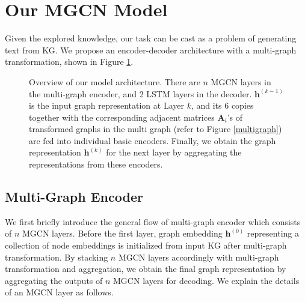 \documentclass[11pt,a4paper]{article}
\renewcommand{\vec}[1]{\mathbf{#1}} \usepackage{color, colortbl}
\renewcommand{\vec}[1]{\mathbf{#1}}
\begin{document}
\section{Our MGCN Model}
Given the explored knowledge, our task can be cast as a problem of generating text from KG.
We propose an encoder-decoder architecture with a multi-graph transformation, shown in Figure \ref{layer}.

\begin{figure*}[t!]
\caption{\label{layer} Overview of our model architecture. There are $n$ MGCN layers in the multi-graph encoder, and 2 LSTM layers in the decoder. $\vec{h}^{(k-1)}$ is the input graph representation at Layer $k$, and its 6 copies together with the corresponding adjacent matrices $\mathbf{A}_i$'s of transformed graphs in the multi graph (refer to Figure \ref{multigraph}) are fed into individual basic encoders.  Finally, we obtain the graph representation $\vec{h}^{(k)}$ for the next layer by aggregating the representations from these encoders.}
\end{figure*}

\subsection{Multi-Graph Encoder}
We first briefly introduce the general flow of multi-graph encoder which consists of $n$ MGCN layers.
Before the first layer, graph embedding $\vec{h}^{(0)}$ representing a collection of node embeddings is initialized from input KG after multi-graph transformation.
By stacking $n$ MGCN layers accordingly with multi-graph transformation and aggregation, we obtain the final graph representation by aggregating the outputs of $n$ MGCN layers for decoding. We explain the details of an MGCN layer as follows. 
\end{document}
